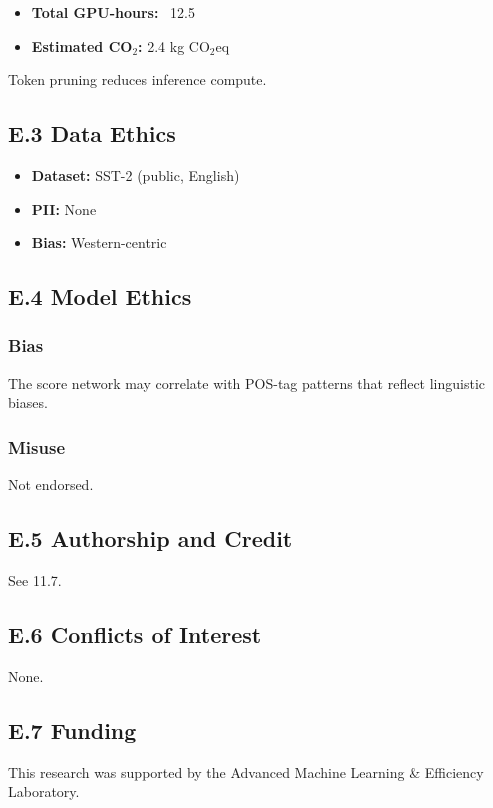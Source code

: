 {\begin{itemize}
\item \textbf{Total GPU-hours:} ~12.5
\item \textbf{Estimated CO$_2$:} 2.4 kg CO$_2$eq

\end{itemize}
Token pruning reduces inference compute.

\subsection{E.3 Data Ethics}

\begin{itemize}
\item \textbf{Dataset:} SST-2 (public, English)
\item \textbf{PII:} None
\item \textbf{Bias:} Western-centric

\end{itemize}
\subsection{E.4 Model Ethics}

\subsubsection{Bias}
The score network may correlate with POS-tag patterns that reflect 
linguistic biases.

\subsubsection{Misuse}
Not endorsed.

\subsection{E.5 Authorship and Credit}

See  11.7.

\subsection{E.6 Conflicts of Interest}

None.

\subsection{E.7 Funding}

This research was supported by the Advanced Machine Learning & Efficiency Laboratory.

}
